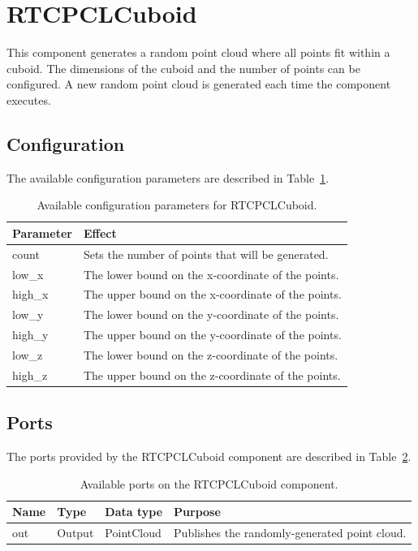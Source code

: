 \documentclass[a4paper,10pt]{article}
\begin{document}
\section{RTCPCLCuboid}
\label{sec:rtcpclcuboid}

This component generates a random point cloud where all points fit within a
cuboid. The dimensions of the cuboid and the number of points can be
configured. A new random point cloud is generated each time the component
executes.

\subsection{Configuration}
\label{sec1:cuboid_configuration}

The available configuration parameters are described in
Table~\ref{tab:cuboid_config_params}.

\begin{table}[t]
  \centering
  \begin{tabularx}{\columnwidth}{lX}
    \toprule
    Parameter & Effect \\
    \midrule
    count & Sets the number of points that will be generated. \\
    low\_x & The lower bound on the x-coordinate of the points. \\
    high\_x & The upper bound on the x-coordinate of the points. \\
    low\_y & The lower bound on the y-coordinate of the points. \\
    high\_y & The upper bound on the y-coordinate of the points. \\
    low\_z & The lower bound on the z-coordinate of the points. \\
    high\_z & The upper bound on the z-coordinate of the points. \\
    \bottomrule
  \end{tabularx}
  \caption{Available configuration parameters for RTCPCLCuboid.}
  \label{tab:cuboid_config_params}
\end{table}

\subsection{Ports}
\label{sec1:cuboid_port}

The ports provided by the RTCPCLCuboid component are described in
Table~\ref{tab:cuboid_ports}.

\begin{table}[t]
  \centering
  \begin{tabularx}{\columnwidth}{lllX}
    \toprule
    Name & Type & Data type & Purpose \\
    \midrule
    out & Output & PointCloud & Publishes the randomly-generated point cloud. \\
    \bottomrule
  \end{tabularx}
  \caption{Available ports on the RTCPCLCuboid component.}
  \label{tab:cuboid_ports}
\end{table}
\end{document}
